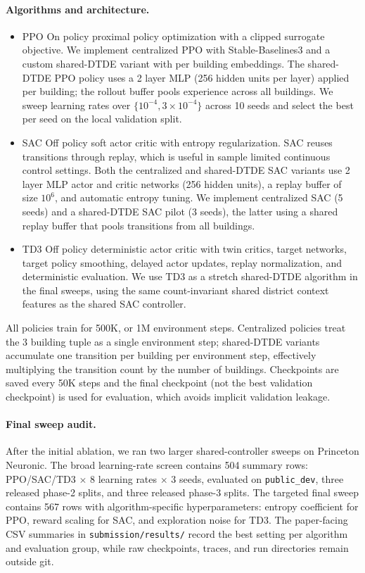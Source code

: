 \documentclass{article}
\begin{document}
\paragraph{Algorithms and architecture.}
\begin{itemize}
    \item PPO \citep{schulman2017proximal}  On policy proximal policy optimization with a clipped surrogate objective. We implement centralized PPO with Stable-Baselines3 \citep{raffin2021stable} and a custom shared-DTDE variant with per building embeddings. The shared-DTDE PPO policy uses a 2 layer MLP (256 hidden units per layer) applied per building; the rollout buffer pools experience across all buildings. We sweep learning rates over $\{10^{-4}, 3\times10^{-4}\}$ across 10 seeds and select the best per seed on the local validation split.
    \item SAC \citep{haarnoja2018soft}  Off policy soft actor critic with entropy regularization. SAC reuses transitions through replay, which is useful in sample limited continuous control settings. Both the centralized and shared-DTDE SAC variants use 2 layer MLP actor and critic networks (256 hidden units), a replay buffer of size $10^6$, and automatic entropy tuning. We implement centralized SAC (5 seeds) and a shared-DTDE SAC pilot (3 seeds), the latter using a shared replay buffer that pools transitions from all buildings.
    \item TD3 \citep{fujimoto2018addressing}  Off policy deterministic actor critic with twin critics, target networks, target policy smoothing, delayed actor updates, replay normalization, and deterministic evaluation. We use TD3 as a stretch shared-DTDE algorithm in the final sweeps, using the same count-invariant shared district context features as the shared SAC controller.
\end{itemize}

All policies train for 500K, or 1M environment steps. Centralized policies treat the 3 building tuple as a single environment step; shared-DTDE variants accumulate one transition per building per environment step, effectively multiplying the transition count by the number of buildings. Checkpoints are saved every 50K steps and the final checkpoint (not the best validation checkpoint) is used for evaluation, which avoids implicit validation leakage.

\paragraph{Final sweep audit.}
After the initial ablation, we ran two larger shared-controller sweeps on Princeton Neuronic. The broad learning-rate screen contains 504 summary rows: PPO/SAC/TD3 $\times$ 8 learning rates $\times$ 3 seeds, evaluated on \texttt{public\_dev}, three released phase-2 splits, and three released phase-3 splits. The targeted final sweep contains 567 rows with algorithm-specific hyperparameters: entropy coefficient for PPO, reward scaling for SAC, and exploration noise for TD3. The paper-facing CSV summaries in \texttt{submission/results/} record the best setting per algorithm and evaluation group, while raw checkpoints, traces, and run directories remain outside git.
\end{document}
